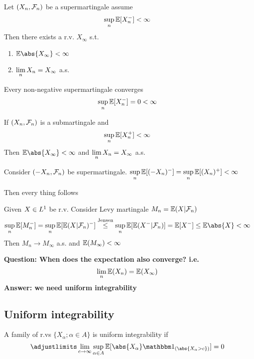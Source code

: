 \newpage
\begin{thm}
\label{SMCT}
Let $(X_n, \mathcal{F}_n)$ be a supermartingale assume
\begin{equation*}
    \sup\limits_n \mathbb{E}[X_n^-] < \infty
\end{equation*}Then there exists a r.v. $X_\infty$ s.t.
\begin{enumerate}
    \item $\E\abs{X_\infty} <\infty$
    \item $\lim\limits_{n} X_n = X_\infty$ a.s.
\end{enumerate}
\end{thm}
\pf \vfill
\begin{cor} Every non-negative supermartingale converges
\begin{equation*}
    \sup\limits_n \mathbb{E}[X_n^-] = 0 < \infty
\end{equation*}
\end{cor}
\begin{cor}If $(X_n, \mathcal{F}_n)$ is a submartingale and \begin{equation*}
    \sup\limits_n \mathbb{E}[X_n^+] < \infty
\end{equation*} Then $\E\abs{X_\infty} <\infty$ and $\lim\limits_{n} X_n = X_\infty$ a.s.
\end{cor}
\pf Consider $(-X_n, \mathcal{F}_n)$ be supermartingale. $\sup\limits_n \mathbb{E}[(-X_n)^-] =\sup\limits_n \mathbb{E}[(X_n)^+]  < \infty$
    
Then every thing follows
\begin{example}
Given $X\in L^{1}$ be r.v. Consider Levy martingale $M_n = \mathbb{E}(X|\mathcal{F}_n)$
\begin{equation*}
    \sup\limits_n \E[M_n^-] = \sup\limits_n \E[\E(X|\F_n)^-] \stackrel{\text{Jensen}}{\leq} \sup\limits_n \E[\E(X^-|\F_n)] = \E[X^-] \leq\E\abs{X} <\infty
\end{equation*}Then $M_n \rightarrow M_\infty $ a.s. and $\mathbb{E}(M_\infty)<\infty$
\end{example}
\newpage \textbf{Question: When does the expectation also converge? i.e.}  \begin{equation*}
    \lim\limits_{n}\mathbb{E}(X_n) =  \mathbb{E}(X_\infty)
\end{equation*}
\textbf{Answer: we need uniform integrability}

\subsection{Uniform integrability}
\begin{dfn}
A family of r.vs $\{X_\alpha; \alpha\in A\}$ is uniform integrability if 
\begin{equation*}
    \adjustlimits\lim_{c\rightarrow \infty} \sup_{\alpha\in A}\E[\abs{X_\alpha} \I_{(\abs{X_\alpha > c})}] =0
\end{equation*}
\end{dfn}

